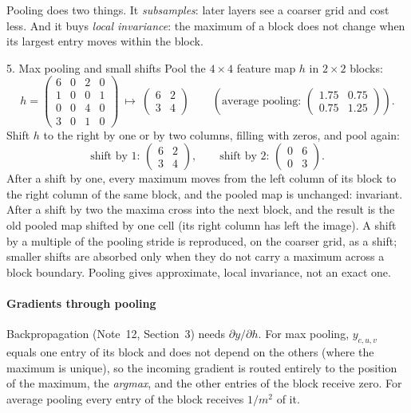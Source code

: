 \documentclass[11pt]{article}
\begin{document}
Pooling does two things. It \emph{subsamples}: later layers see a coarser grid and cost less. And it buys \emph{local
invariance}: the maximum of a block does not change when its largest entry moves within the block.

\begin{worked}{5. Max pooling and small shifts}
Pool the $4 \times 4$ feature map $h$ in $2 \times 2$ blocks:
\[
  h = \begin{pmatrix} 6 & 0 & 2 & 0 \\ 1 & 0 & 0 & 1 \\ 0 & 0 & 4 & 0 \\ 3 & 0 & 1 & 0 \end{pmatrix}
  \ \longmapsto\ \begin{pmatrix} 6 & 2 \\ 3 & 4 \end{pmatrix}
  \qquad(\text{average pooling: } \begin{pmatrix} 1.75 & 0.75 \\ 0.75 & 1.25 \end{pmatrix}).
\]
Shift $h$ to the right by one or by two columns, filling with zeros, and pool again:
\[
  \text{shift by 1: } \begin{pmatrix} 6 & 2 \\ 3 & 4 \end{pmatrix}, \qquad
  \text{shift by 2: } \begin{pmatrix} 0 & 6 \\ 0 & 3 \end{pmatrix} .
\]
After a shift by one, every maximum moves from the left column of its block to the right column of the same block, and
the pooled map is unchanged: invariant. After a shift by two the maxima cross into the next block, and the result is the
old pooled map shifted by one cell (its right column has left the image). A shift by a multiple of the pooling stride is reproduced, on the coarser grid, as a shift; smaller shifts are
absorbed only when they do not carry a maximum across a block boundary. Pooling gives approximate, local invariance, not
an exact one.
\end{worked}

\paragraph{Gradients through pooling} Backpropagation (Note~12, Section~3) needs $\partial y/\partial h$. For max pooling, $y_{c,u,v}$
equals one entry of its block and does not depend on the others (where the maximum is unique), so the incoming gradient
is routed entirely to the position of the maximum, the \emph{argmax}, and the other entries of the block receive zero.
For average pooling every entry of the block receives $1/m^2$ of it.
\end{document}
